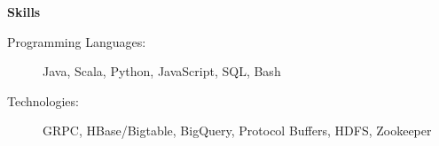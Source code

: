 \documentclass[letterpaper,11pt]{article}
\newcommand{\resheading}[1]{{\large \colorbox{mygrey}{\begin{minipage}{\textwidth}{\textbf{#1 \vphantom{p\^{E}}}}\end{minipage}}}}
\begin{document}
\resheading{Skills}
\begin{description}
	\item[Programming Languages:] { \footnotesize
	      Java, Scala, Python, JavaScript, SQL, Bash
	}
	\item[Technologies:] { \footnotesize
	      GRPC, HBase/Bigtable, BigQuery, Protocol Buffers, HDFS, Zookeeper
	}
\end{description} %

\end{document}

